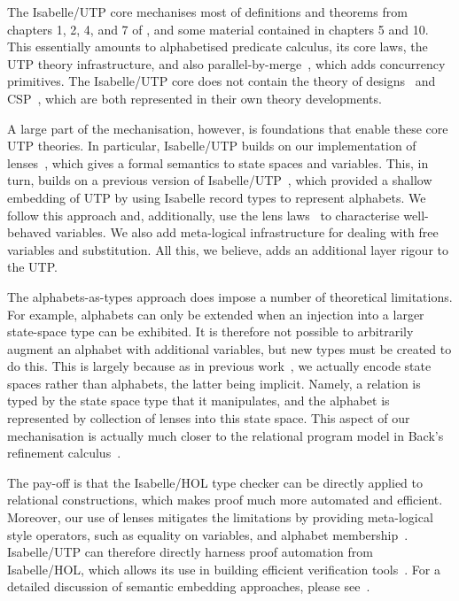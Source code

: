 \documentclass[11pt,a4paper]{article}
\begin{document}
The Isabelle/UTP core mechanises most of definitions and theorems from chapters 1, 2, 4, and 7 of \cite{Hoare&98}, and some material
contained in chapters 5 and 10. This essentially amounts to alphabetised predicate calculus, its core laws, the UTP
theory infrastructure, and also parallel-by-merge~\cite[chapter~5]{Hoare&98}, which adds concurrency primitives. The
Isabelle/UTP core does not contain the theory of designs~\cite{Cavalcanti04} and CSP~\cite{Cavalcanti&06}, which are
both represented in their own theory developments.

A large part of the mechanisation, however, is foundations that enable these core UTP theories. In particular,
Isabelle/UTP builds on our implementation of lenses~\cite{Foster16a,Optics-AFP}, which gives a formal semantics to state
spaces and variables. This, in turn, builds on a previous version of Isabelle/UTP~\cite{Feliachi2010,Feliachi2012},
which provided a shallow embedding of UTP by using Isabelle record types to represent alphabets. We follow this approach
and, additionally, use the lens laws~\cite{Foster09,Foster16a} to characterise well-behaved variables. We also add
meta-logical infrastructure for dealing with free variables and substitution. All this, we believe, adds an additional
layer rigour to the UTP.

The alphabets-as-types approach does impose a number of theoretical limitations. For example, alphabets can only be
extended when an injection into a larger state-space type can be exhibited. It is therefore not possible to arbitrarily
augment an alphabet with additional variables, but new types must be created to do this. This is largely because
as in previous work~\cite{Feliachi2010,Feliachi2012}, we actually encode state spaces rather than alphabets, 
the latter being implicit. Namely, a relation is typed by the state space type that it manipulates, and the alphabet
is represented by collection of lenses into this state space. This aspect of our mechanisation is actually much closer 
to the relational program model in Back's refinement calculus~\cite{Back1998}. 

The pay-off is that the Isabelle/HOL type checker can be directly applied to relational constructions, which makes proof much more automated and
efficient. Moreover, our use of lenses mitigates the limitations by providing meta-logical style operators, such as
equality on variables, and alphabet membership~\cite{Foster16a}. Isabelle/UTP can therefore directly
harness proof automation from Isabelle/HOL, which allows its use in building efficient verification
tools~\cite{Foster18a,Foster18b}. For a detailed discussion of semantic embedding approaches, please see~\cite{Foster16c}.
\end{document}
